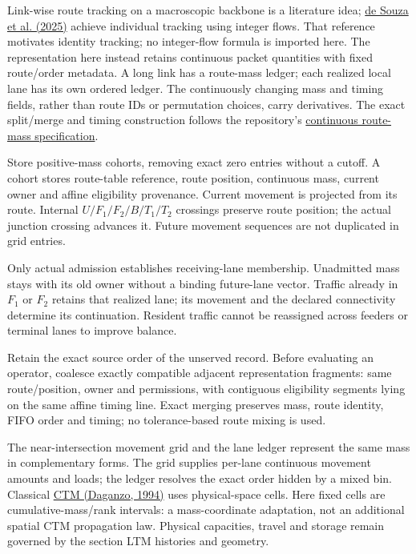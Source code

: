 \documentclass[10pt,a4paper]{article}
\begin{document}
Link-wise route tracking on a macroscopic backbone is a literature idea;
\href{https://doi.org/10.1016/j.simpat.2025.103088}{de Souza et al. (2025)}
achieve individual tracking using integer flows.
That reference motivates identity tracking; no integer-flow formula is imported here.
The representation here
instead retains continuous packet quantities with fixed route/order
metadata. A long link has a route-mass ledger; each realized local lane
has its own ordered ledger. The continuously changing mass and timing
fields, rather than route IDs or permutation choices, carry derivatives.
The exact split/merge and timing construction follows the repository's
\href{../../../../docs/milestones/milestone_1_ordered_route_mass_ledger.md}{continuous route-mass specification}.
\par

Store positive-mass cohorts, removing exact zero entries without a cutoff.
A cohort stores route-table reference, route position, continuous mass,
current owner and affine eligibility provenance. Current movement is
projected from its route. Internal $U/F_1/F_2/B/T_1/T_2$ crossings preserve route
position; the actual junction crossing advances it. Future movement
sequences are not duplicated in grid entries.

Only actual admission establishes receiving-lane membership. Unadmitted
mass stays with its old owner without a binding future-lane vector.
Traffic already in $F_1$ or $F_2$ retains that realized lane; its movement
and the declared connectivity determine its continuation. Resident traffic
cannot be reassigned across feeders or terminal lanes to improve balance.

Retain the exact source order of the unserved record. Before evaluating
an operator, coalesce exactly compatible adjacent representation fragments:
same route/position, owner and permissions, with contiguous eligibility
segments lying on the same affine timing line. Exact merging preserves
mass, route identity, FIFO order and timing; no tolerance-based route
mixing is used.


The near-intersection movement grid and the lane ledger represent the
same mass in complementary forms. The grid supplies per-lane continuous
movement amounts and loads; the ledger resolves the exact order hidden
by a mixed bin. Classical
\href{https://doi.org/10.1016/0191-2615(94)90002-7}{CTM (Daganzo, 1994)}
uses physical-space cells. Here fixed cells are cumulative-mass/rank
intervals: a mass-coordinate adaptation, not an additional spatial CTM
propagation law. Physical capacities, travel and storage remain governed
by the section LTM histories and geometry.
\end{document}
